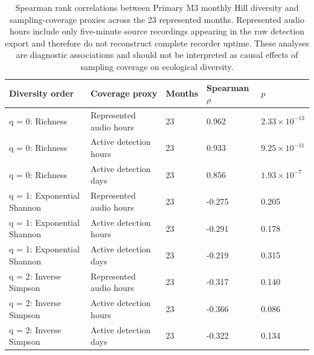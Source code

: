 \clearpage
\begin{table}[p]
\centering
\caption{Spearman rank correlations between Primary M3 monthly Hill diversity and sampling-coverage proxies across the 23 represented months. Represented audio hours include only five-minute source recordings appearing in the raw detection export and therefore do not reconstruct complete recorder uptime. These analyses are diagnostic associations and should not be interpreted as causal effects of sampling coverage on ecological diversity.}
\label{tab:supp-coverage}
\small
\begin{tabular}{L{3.8cm}L{4.2cm}C{1.6cm}C{1.8cm}C{2.3cm}}
\toprule
Diversity order & Coverage proxy & Months & Spearman $\rho$ & $p$ \\
\midrule
q = 0: Richness & Represented audio hours & 23 & 0.962 & $2.33\times 10^{-13}$ \\
q = 0: Richness & Active detection hours & 23 & 0.933 & $9.25\times 10^{-11}$ \\
q = 0: Richness & Active detection days & 23 & 0.856 & $1.93\times 10^{-7}$ \\
q = 1: Exponential Shannon & Represented audio hours & 23 & -0.275 & 0.205 \\
q = 1: Exponential Shannon & Active detection hours & 23 & -0.291 & 0.178 \\
q = 1: Exponential Shannon & Active detection days & 23 & -0.219 & 0.315 \\
q = 2: Inverse Simpson & Represented audio hours & 23 & -0.317 & 0.140 \\
q = 2: Inverse Simpson & Active detection hours & 23 & -0.366 & 0.086 \\
q = 2: Inverse Simpson & Active detection days & 23 & -0.322 & 0.134 \\
\bottomrule
\end{tabular}
\end{table}
